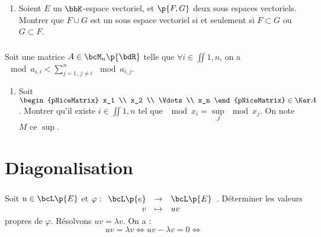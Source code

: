 \documentclass[a4paper,french,bookmarks]{book}
\begin{document}
    \subsection{}
    
    \begin{enumerate}
        \item Soient $E$ un $\bbK$-espace vectoriel, et $\p{F, G}$ deux sous espaces vectoriels. Montrer que $F \cup G$ est un sous espace vectoriel si et seulement si $F \subset G$ ou $G \subset F$.
    \end{enumerate}
    
    \subsection{}
    
    \subsection{}
    
    Soit une matrice $A \in \bcM_n\p{\bdR}$ telle que $\forall i \in \iint{1, n}$, on a $\mod{a_{i, i}} < \displaystyle\sum_{j = 1,\ j \neq i}^n \mod{a_{i, j}}$.
    
    \begin{enumerate}
        \item Soit $\begin{pNiceMatrix}
            x_1 \\ x_2 \\ \Vdots \\ x_n
        \end{pNiceMatrix} \in \Ker A$. Montrer qu'il existe $i \in \iint{1, n}$ tel que $\mod{x_i} = \sup\limits_J \mod{x_j}$. On note $M$ ce $\sup$.
    \end{enumerate}
    
    \chapter{Diagonalisation}
    
    \subsection{}
    
    Soit $u \in \bcL\p{E}$ et $\varphi : \begin{array}[t]{rcl}
        \bcL\p{e} &\to& \bcL\p{E}  \\
        v &\mapsto& uv 
    \end{array}$. Déterminer les valeurs propres de $\varphi$.
    Résolvons $uv = \lambda v$. On a :
    \[ uv = \lambda v \iff uv - \lambda v = 0 \iff \]
    
\end{document}
